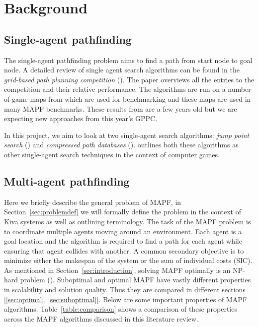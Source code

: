 \documentclass[a4paper,11pt]{article}
\begin{document}
\section{Background} \label{sec:background}
\subsection{Single-agent pathfinding} The single-agent pathfinding problem aims to find a path from start node to goal node. A detailed review of single agent search algorithms can be found in the \textit{grid-based path planning competition} (\cite{sturtevant2015grid}). The paper overviews all the entries to the competition and their relative performance. The algorithms are run on a number of game maps from \cite{sturtevant2012benchmarks} which are used for benchmarking and these maps are used in many MAPF benchmarks. These results from \cite{sturtevant2015grid} are a few years old but we are expecting new approaches from this year's GPPC.

In this project, we aim to look at two single-agent search algorithms: \textit{jump point search} (\cite{harabor2011online}) and \textit{compressed path databases} (\cite{strasser2015compressing}). \cite{botea2013pathfinding} outlines both these algorithms as other single-agent search techniques in the context of computer games.

\subsection{Multi-agent pathfinding} Here we briefly describe the general problem of MAPF, in Section~\ref{sec:problemdef} we will formally define the problem in the context of Kiva systems as well as outlining terminology. The task of the MAPF problem is to coordinate multiple agents moving around an environment. Each agent is a goal location and the algorithm is required to find a path for each agent while ensuring that agent collides with another. A common secondary objective is to minimize either the makespan of the system or the sum of individual costs (SIC). As mentioned in Section~\ref{sec:introduction}, solving MAPF optimally is an NP-hard problem (\cite{yu2013structure}). Suboptimal and optimal MAPF have vastly different properties in scalability and solution quality. Thus they are compared in different sections [\ref{sec:optimal}, \ref{sec:suboptimal}]. Below are some important properties of MAPF algorithms. Table~\ref{table:comparison} shows a comparison of these properties across the MAPF algorithms discussed in this literature review.
\end{document}
